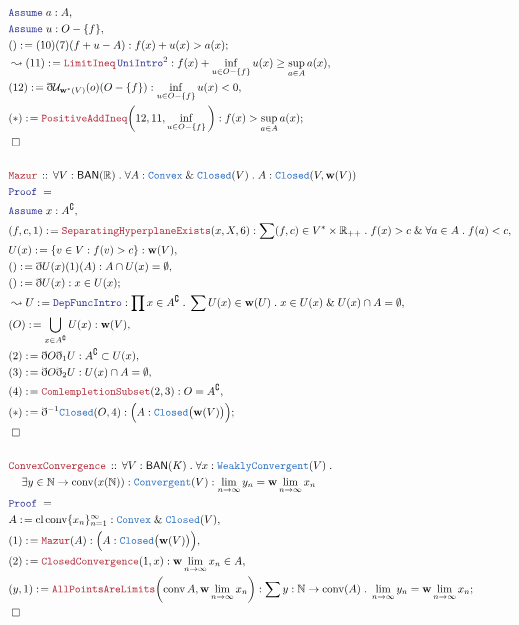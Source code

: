 \documentclass[12pt]{scrartcl}
\newcommand{\TYPE}[1]{\textcolor{NavyBlue}{\mathtt{#1}}}
\newcommand{\LOGIC}[1]{\textcolor{Blue}{\mathtt{#1}}}
\newcommand{\THM}[1]{\textcolor{Maroon}{\mathtt{#1}}}
\renewcommand{\.}{\; . \;}
\newcommand{\de}{: \kern 0.1pc =}
\newcommand{\Theorem}[2]{& \THM{#1} \, :: \, #2 \\ & \Proof = \\ }
\newcommand{\NewLine}{\\ & \kern 1pc}
\newcommand{\Page}[1]{\begin{align*} #1 \end{align*} \newpage   }
\newcommand{ \bd }{ \ByDef }
\renewcommand{\And}{\; \& \;}
\newcommand{\Reals}{\mathbb{R} }
\newcommand{\Nat}{\mathbb{N} }
\renewcommand{\c}{\complement}
\newcommand{\Say}[3]{& #1 \de #2 : #3, \\}
\newcommand{\Conclude}[3]{& #1 \de #2 : #3; \\}
\newcommand{\Derive}[3]{& \leadsto #1 \de #2 : #3, \\}
\newcommand{\A}{\LOGIC{Assume} \;}
\newcommand{\Assume}[2]{& \A #1 : #2, \\}
\newcommand{\QED}{\; \square}
\newcommand{\EndProof}{& \QED \\}
\newcommand{\ByDef}{\eth}
\newcommand{\Proof}{\LOGIC{Proof} \; }
\newcommand{\BAN}{\textsf{BAN}}
\begin{document}
\Page{
\Assume{a}{A}
\Assume{u}{O - \{ f\} }
\Conclude{()}{(10)(7)(f + u - A)}{ f(x) + u(x) > a(x)}
\Derive{(11)}{\THM{LimitIneq}\,\LOGIC{UniIntro}^2}{f(x) + \inf_{u \in O - \{f\}} u(x) \ge \sup_{a \in A} a(x) }
\Say{(12)}{\bd \mathcal{U}_{\mathbf{w}^*(V)}(o)(O - \{f\})}{\inf_{u \in O - \{f\}} u(x) < 0}
\Conclude{(*)}{\THM{PositiveAddIneq}\bigg(12,11,\inf_{u \in O - \{f\}}\bigg)}{ f(x) >  \sup_{a \in A} a(x)}
\EndProof
\\
\Theorem{Mazur}{\forall V : \BAN(\Reals) \. \forall A : \TYPE{Convex} \And \TYPE{Closed}(V) \.
      A : \TYPE{Closed}(V,\mathbf{w}(V))
 }
\Assume{x}{A^\c}
\Say{(f,c,1)}{\THM{SeparatingHyperplaneExists}(x,X,6)}{\sum (f,c) \in V^* \times \Reals_{++} \. f(x) > c \And \forall a \in A \. f(a) < c 
}
\Say{U(x)}{\{ v \in V : f(v) > c  \}}{\mathbf{w}(V)}
\Say{()}{\bd U(x)(1)(A)}{A \cap U(x) = \emptyset}
\Conclude{()}{\bd U(x)}{ x \in U(x)}
\Derive{U}{\LOGIC{DepFuncIntro}}{\prod x \in A^\c \. \sum U(x) \in \mathbf{w}(U) \. x \in U(x) \And U(x) \cap A = \emptyset}
\Say{(O)}{\bigcup_{x \in A^\c} U(x)}{\mathbf{w}(V)}
\Say{(2)}{\bd O \bd_1 U}{A^\c \subset U(x)}
\Say{(3)}{\bd O \bd_2 U}{ U(x) \cap A = \emptyset}
\Say{(4)}{\THM{ComlempletionSubset}(2,3)}{O = A^\c}
\Conclude{(*)}{\bd^{-1} \TYPE{Closed}(O,4)}{\Big(A : \TYPE{Closed}\big(\mathbf{w}(V)\big) \Big) }
\EndProof
\\
\Theorem{ConvexConvergence}{ \forall V : \BAN(K) \. \forall x : \TYPE{WeaklyConvergent}(V) \.
\NewLine
 \exists y \in \Nat \to \mathrm{conv}( x(\Nat)) : \TYPE{Convergent}(V) : \lim_{n \to \infty} y_n = \mathbf{w}\- \lim_{n \to \infty} x_n  
}
\Say{A}{\mathrm{cl}\, \mathrm{conv}\{  x_n \}^\infty_{n = 1}}{\TYPE{Convex} \And \TYPE{Closed}(V) }
\Say{(1)}{\THM{Mazur}(A)}{\Big(A : \TYPE{Closed}\big(\mathbf{w}(V)\big) \Big)}
\Say{(2)}{\THM{ClosedConvergence}(1,x)}{\mathbf{w}\- \lim_{n \to \infty} x_n \in A}
\Conclude{(y,1)}{\THM{AllPointsAreLimits}\bigg(\mathrm{conv} \, A, \mathbf{w}\- \lim_{n \to \infty} x_n\bigg)}
{ \sum y : \Nat \to \mathrm{conv}(A) \. \lim_{n \to \infty} y_n = \mathbf{w}\- \lim_{n \to \infty} x_n }
\EndProof
}
\end{document}
